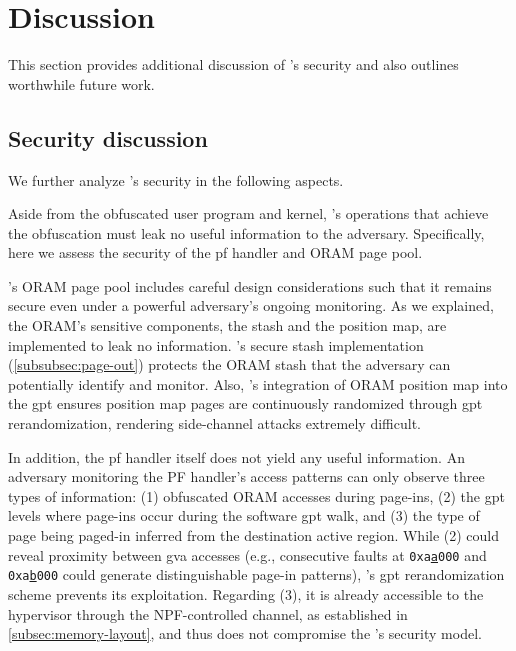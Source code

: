 
\section{Discussion}

This section provides additional discussion of \thename's security and also outlines worthwhile future work.

\subsection{Security discussion}
\label{sec:sec-analysis}
\label{sec:sec-ana}
\label{subsec:security-discussion}
We further analyze \thename's security in the following aspects.

Aside from the obfuscated user program and kernel, \thename's operations that achieve the obfuscation must leak no useful information to the adversary.
Specifically, here we assess the security of the \gls{pf} handler and ORAM page pool.

\thename's ORAM page pool includes careful design considerations such that it remains secure even under a powerful adversary's ongoing monitoring.
As we explained, the ORAM's sensitive components, the stash and the position map, are implemented to leak no information.
\thename's secure stash implementation (\cref{subsubsec:page-out}) protects the ORAM stash that the adversary can potentially identify and monitor.
Also, \thename's integration of ORAM position map into the \gls{gpt} ensures position map pages are continuously randomized through \gls{gpt} rerandomization, rendering side-channel attacks extremely difficult.

In addition, the \gls{pf} handler itself does not yield any useful information.
An adversary monitoring the PF handler's access patterns can only observe three types of information: (1) obfuscated ORAM accesses during page-ins, (2) the \gls{gpt} levels where page-ins occur during the software \gls{gpt} walk, and (3) the type of page being paged-in inferred from the destination active region.
While (2) could reveal proximity between \gls{gva} accesses (e.g., consecutive faults at {\tt 0xa{\underline{a}}000} and {\tt 0xa{\underline{b}}000} could generate distinguishable page-in patterns), \thename's \gls{gpt} rerandomization scheme prevents its exploitation. Regarding (3), it is already accessible to the hypervisor through the NPF-controlled channel, as established in \cref{subsec:memory-layout}, and thus does not compromise the \thename's security model.





